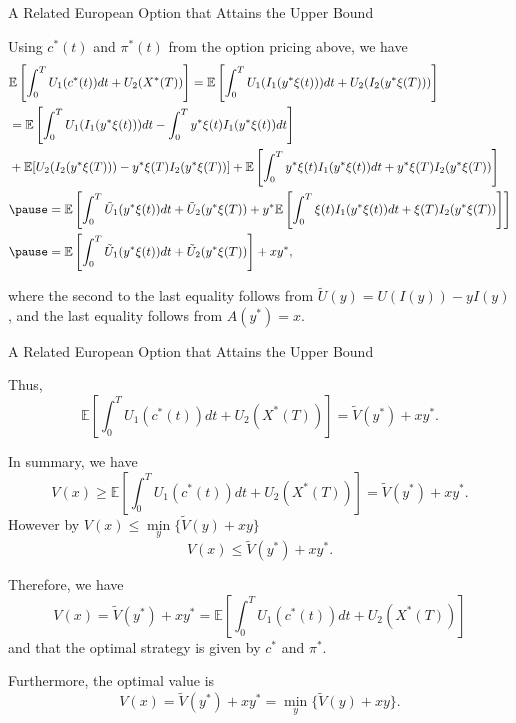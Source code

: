\documentclass{beamer}
\begin{document}
\begin{frame}{A Related European Option that Attains the Upper Bound}

    {\footnotesize \footnotesize
  
 
\par Using \( c^*(t) \) and \( \pi^*(t) \) from the option pricing above, we have
 {\footnotesize \tiny
\begin{align*}
   & \mathbb{E} \left[ \int_0^T U_1(c^*(t))dt + U_2(X^*(T)) \right]
    = \mathbb{E} \left[ \int_0^T U_1(I_1(y^*\xi(t)))dt + U_2(I_2(y^*\xi(T))) \right]\\
    &= \mathbb{E} \left[ \int_0^T U_1(I_1(y^*\xi(t)))dt - \int_0^T y^*\xi(t)I_1(y^*\xi(t))dt \right]\\
    & + \mathbb{E}[U_2(I_2(y^*\xi(T))) - y^*\xi(T)I_2(y^*\xi(T))] 
    + \mathbb{E} \left[ \int_0^T y^*\xi(t)I_1(y^*\xi(t))dt + y^*\xi(T)I_2(y^*\xi(T)) \right] \\
    & \pause = \mathbb{E} \left[ \int_0^T \tilde{U}_1(y^*\xi(t))dt + \tilde{U}_2(y^*\xi(T)) + 
    y^*\mathbb{E} \left[ \int_0^T \xi(t)I_1(y^*\xi(t))dt + \xi(T)I_2(y^*\xi(T)) \right] \right]\\
    &  \pause = \mathbb{E} \left[ \int_0^T \tilde{U}_1(y^*\xi(t))dt + \tilde{U}_2(y^*\xi(T)) \right] + xy^*,
\end{align*}
    }
\par  \pause where the second to the last equality follows from $\tilde{U}(y) = U(I(y)) - yI(y)$
, and the last equality follows from $ A(y^*) = x.  $
    }
\end{frame}

\begin{frame}{A Related European Option that Attains the Upper Bound}

    {\footnotesize \footnotesize
   Thus,
\[
\mathbb{E} \left[ \int_0^T U_1(c^*(t))dt + U_2(X^*(T)) \right] = \tilde{V}(y^*) + xy^*.
\]

In summary, we have
\[
V(x) \geq \mathbb{E} \left[ \int_0^T U_1(c^*(t))dt + U_2(X^*(T)) \right] = \tilde{V}(y^*) + xy^*. 
\]
 \pause However by $V(x) \leq \min\limits_{y} \{\tilde{V}(y) + xy\}$
\[
V(x) \leq \tilde{V}(y^*) + xy^*. 
\]

Therefore, we have
\[
V(x) = \tilde{V}(y^*) + xy^* = \mathbb{E} \left[ \int_0^T U_1(c^*(t))dt + U_2(X^*(T)) \right]
\]
and that the optimal strategy is given by \( c^* \) and \( \pi^* \).

Furthermore, the optimal value is
\[
V(x) = \tilde{V}(y^*) + xy^* = \min_y \{\tilde{V}(y) + xy\}.
\]
    }
\end{frame}
\end{document}
